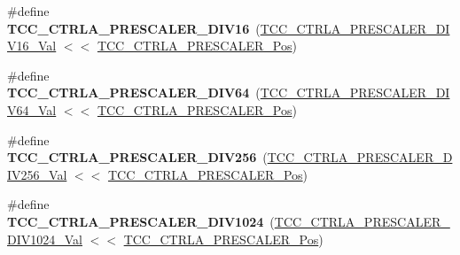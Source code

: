 \begin{DoxyCompactItemize}
\item 
\hypertarget{group___s_a_m_l21___t_c_c_gaf18e64ad5c2675a04045bd2177148cf1}{}\#define {\bfseries T\+C\+C\+\_\+\+C\+T\+R\+L\+A\+\_\+\+P\+R\+E\+S\+C\+A\+L\+E\+R\+\_\+\+D\+I\+V16}~(\hyperlink{group___s_a_m_l21___t_c_c_ga46a957fcc978f04368174f8ed3aabc6a}{T\+C\+C\+\_\+\+C\+T\+R\+L\+A\+\_\+\+P\+R\+E\+S\+C\+A\+L\+E\+R\+\_\+\+D\+I\+V16\+\_\+\+Val} $<$$<$ \hyperlink{group___s_a_m_l21___t_c_c_ga32250640d272bee4d7ef7ef16fd8d97d}{T\+C\+C\+\_\+\+C\+T\+R\+L\+A\+\_\+\+P\+R\+E\+S\+C\+A\+L\+E\+R\+\_\+\+Pos})\label{group___s_a_m_l21___t_c_c_gaf18e64ad5c2675a04045bd2177148cf1}

\item 
\hypertarget{group___s_a_m_l21___t_c_c_ga6051e6f7b91cb5ed0e97b4b2b593ad17}{}\#define {\bfseries T\+C\+C\+\_\+\+C\+T\+R\+L\+A\+\_\+\+P\+R\+E\+S\+C\+A\+L\+E\+R\+\_\+\+D\+I\+V64}~(\hyperlink{group___s_a_m_l21___t_c_c_ga6daeff90ce71f7388fd83f92cb070c81}{T\+C\+C\+\_\+\+C\+T\+R\+L\+A\+\_\+\+P\+R\+E\+S\+C\+A\+L\+E\+R\+\_\+\+D\+I\+V64\+\_\+\+Val} $<$$<$ \hyperlink{group___s_a_m_l21___t_c_c_ga32250640d272bee4d7ef7ef16fd8d97d}{T\+C\+C\+\_\+\+C\+T\+R\+L\+A\+\_\+\+P\+R\+E\+S\+C\+A\+L\+E\+R\+\_\+\+Pos})\label{group___s_a_m_l21___t_c_c_ga6051e6f7b91cb5ed0e97b4b2b593ad17}

\item 
\hypertarget{group___s_a_m_l21___t_c_c_gae0a0824bd4e94771cd1c4fe44bbaa74a}{}\#define {\bfseries T\+C\+C\+\_\+\+C\+T\+R\+L\+A\+\_\+\+P\+R\+E\+S\+C\+A\+L\+E\+R\+\_\+\+D\+I\+V256}~(\hyperlink{group___s_a_m_l21___t_c_c_ga5a43c8a16e6c71c3baf6e2250f40d71e}{T\+C\+C\+\_\+\+C\+T\+R\+L\+A\+\_\+\+P\+R\+E\+S\+C\+A\+L\+E\+R\+\_\+\+D\+I\+V256\+\_\+\+Val} $<$$<$ \hyperlink{group___s_a_m_l21___t_c_c_ga32250640d272bee4d7ef7ef16fd8d97d}{T\+C\+C\+\_\+\+C\+T\+R\+L\+A\+\_\+\+P\+R\+E\+S\+C\+A\+L\+E\+R\+\_\+\+Pos})\label{group___s_a_m_l21___t_c_c_gae0a0824bd4e94771cd1c4fe44bbaa74a}

\item 
\hypertarget{group___s_a_m_l21___t_c_c_ga0ef3c2f6fce5f31fe5b79edfa31964b8}{}\#define {\bfseries T\+C\+C\+\_\+\+C\+T\+R\+L\+A\+\_\+\+P\+R\+E\+S\+C\+A\+L\+E\+R\+\_\+\+D\+I\+V1024}~(\hyperlink{group___s_a_m_l21___t_c_c_gafd5fb4af4aaf8376cf50e5eb6ab22b17}{T\+C\+C\+\_\+\+C\+T\+R\+L\+A\+\_\+\+P\+R\+E\+S\+C\+A\+L\+E\+R\+\_\+\+D\+I\+V1024\+\_\+\+Val} $<$$<$ \hyperlink{group___s_a_m_l21___t_c_c_ga32250640d272bee4d7ef7ef16fd8d97d}{T\+C\+C\+\_\+\+C\+T\+R\+L\+A\+\_\+\+P\+R\+E\+S\+C\+A\+L\+E\+R\+\_\+\+Pos})\label{group___s_a_m_l21___t_c_c_ga0ef3c2f6fce5f31fe5b79edfa31964b8}


\end{DoxyCompactItemize}

